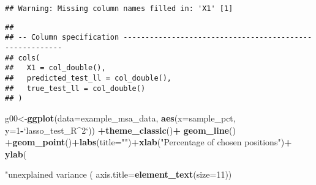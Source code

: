 \documentclass[
]{article}
\newenvironment{Shaded}{\begin{snugshade}}{\end{snugshade}}
\newcommand{\DataTypeTok}[1]{\textcolor[rgb]{0.13,0.29,0.53}{#1}}
\newcommand{\DecValTok}[1]{\textcolor[rgb]{0.00,0.00,0.81}{#1}}
\newcommand{\FloatTok}[1]{\textcolor[rgb]{0.00,0.00,0.81}{#1}}
\newcommand{\KeywordTok}[1]{\textcolor[rgb]{0.13,0.29,0.53}{\textbf{#1}}}
\newcommand{\NormalTok}[1]{#1}
\newcommand{\OperatorTok}[1]{\textcolor[rgb]{0.81,0.36,0.00}{\textbf{#1}}}
\newcommand{\StringTok}[1]{\textcolor[rgb]{0.31,0.60,0.02}{#1}}
\begin{document}
\begin{verbatim}
## Warning: Missing column names filled in: 'X1' [1]
\end{verbatim}

\begin{verbatim}
## 
## -- Column specification --------------------------------------------------------
## cols(
##   X1 = col_double(),
##   predicted_test_ll = col_double(),
##   true_test_ll = col_double()
## )
\end{verbatim}

\begin{Shaded}
\begin{Highlighting}[]
\NormalTok{g00<-}\KeywordTok{ggplot}\NormalTok{(}\DataTypeTok{data=}\NormalTok{example_msa_data, }\KeywordTok{aes}\NormalTok{(}\DataTypeTok{x=}\NormalTok{sample_pct, }\DataTypeTok{y=}\DecValTok{1}\OperatorTok{-}\StringTok{`}\DataTypeTok{lasso_test_R^2}\StringTok{`}\NormalTok{)) }\OperatorTok{+}\KeywordTok{theme_classic}\NormalTok{()}\OperatorTok{+}
\KeywordTok{geom_line}\NormalTok{() }\OperatorTok{+}\KeywordTok{geom_point}\NormalTok{()}\OperatorTok{+}\KeywordTok{labs}\NormalTok{(}\DataTypeTok{title=}\StringTok{""}\NormalTok{)}\OperatorTok{+}\KeywordTok{xlab}\NormalTok{(}\StringTok{"Percentage of chosen positions"}\NormalTok{)}\OperatorTok{+}\StringTok{ }\KeywordTok{ylab}\NormalTok{(}\StringTok{"unexplained variance (%)"}\NormalTok{) }\OperatorTok{+}\StringTok{ }\KeywordTok{theme}\NormalTok{(}\DataTypeTok{plot.title =} \KeywordTok{element_text}\NormalTok{(}\DataTypeTok{hjust =} \FloatTok{0.5}\NormalTok{))}\OperatorTok{+}\KeywordTok{scale_x_continuous}\NormalTok{(}\DataTypeTok{labels =}\NormalTok{ scales}\OperatorTok{::}\NormalTok{percent)}\OperatorTok{+}\KeywordTok{scale_y_continuous}\NormalTok{(}\DataTypeTok{labels =}\NormalTok{ scales}\OperatorTok{::}\NormalTok{percent)}\OperatorTok{+}\StringTok{ }\KeywordTok{theme}\NormalTok{(}\DataTypeTok{plot.title =} \KeywordTok{element_text}\NormalTok{(}\DataTypeTok{hjust =} \FloatTok{0.5}\NormalTok{))}\OperatorTok{+}\KeywordTok{theme}\NormalTok{(}\DataTypeTok{axis.text=}\KeywordTok{element_text}\NormalTok{(}\DataTypeTok{size=}\DecValTok{11}\NormalTok{),}
        \DataTypeTok{axis.title=}\KeywordTok{element_text}\NormalTok{(}\DataTypeTok{size=}\DecValTok{11}\NormalTok{))}

}
\end{Highlighting}
\end{Shaded}
\end{document}
